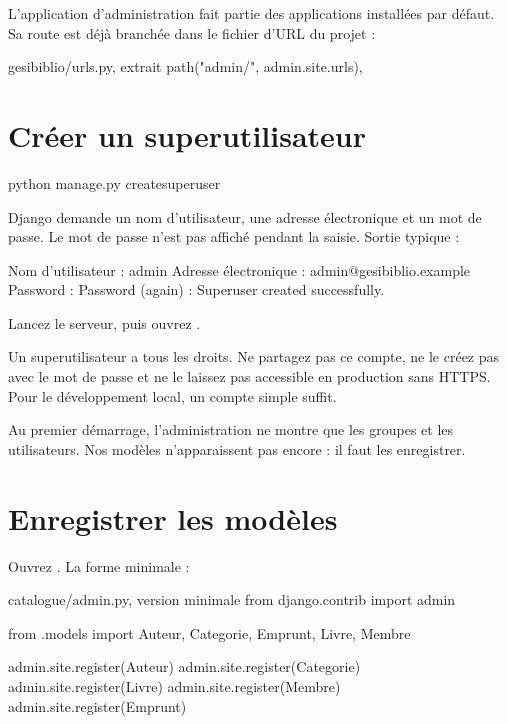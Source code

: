 L'application d'administration fait partie des applications installées par
défaut. Sa route est déjà branchée dans le fichier d'URL du projet :

\begin{codebox}[python]{gesibiblio/urls.py, extrait}
path("admin/", admin.site.urls),
\end{codebox}

\section{Créer un superutilisateur}

\begin{terminal}
python manage.py createsuperuser
\end{terminal}

Django demande un nom d'utilisateur, une adresse électronique et un mot de passe.
Le mot de passe n'est pas affiché pendant la saisie. Sortie typique :

\begin{terminal}
Nom d'utilisateur : admin
Adresse électronique : admin@gesibiblio.example
Password :
Password (again) :
Superuser created successfully.
\end{terminal}

Lancez le serveur, puis ouvrez .

\begin{attention}
Un superutilisateur a tous les droits. Ne partagez pas ce compte, ne le créez pas
avec le mot de passe  et ne le laissez pas accessible en production
sans HTTPS. Pour le développement local, un compte simple suffit.
\end{attention}

Au premier démarrage, l'administration ne montre que les groupes et les
utilisateurs. Nos modèles n'apparaissent pas encore : il faut les enregistrer.

\section{Enregistrer les modèles}

Ouvrez . La forme minimale :

\begin{codebox}[python]{catalogue/admin.py, version minimale}
from django.contrib import admin

from .models import Auteur, Categorie, Emprunt, Livre, Membre

admin.site.register(Auteur)
admin.site.register(Categorie)
admin.site.register(Livre)
admin.site.register(Membre)
admin.site.register(Emprunt)
\end{codebox}

